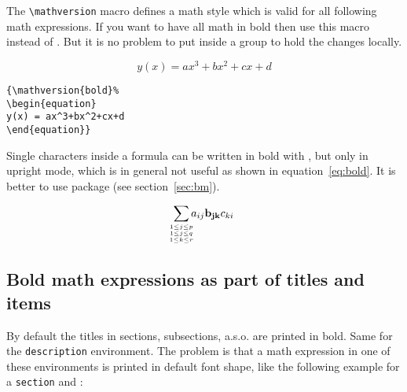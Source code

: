 \begin{table}[htb]
The \verb+\mathversion+ macro defines a math style which is valid for all following
math expressions. If you want to have all math in bold then use this macro instead of
. But it is no problem to put  inside a group to hold
the changes locally.

{%
\begin{equation}
y(x) = ax^3+bx^2+cx+d
\end{equation}}

\begin{lstlisting}
{\mathversion{bold}%
\begin{equation}
y(x) = ax^3+bx^2+cx+d
\end{equation}}
\end{lstlisting}


Single characters inside a formula can be written in bold with , 
but only in upright mode, which is in general not useful as shown in 
equation~\ref{eq:bold}. It is better
to use package  (see section~\vref{sec:bm}).

\begin{equation}\label{eq:bold}
\sum_{%
	\makebox[0pt]{$%
		{{\scriptscriptstyle 1\le j\le p\atop {%
		{1\le j\le q\atop 1\le k\le r}}}}%
	$}%
	}a_{ij}\mathbf{b_{jk}}c_{ki}
\end{equation}

\subsection[Bold math titles and items]{Bold math expressions as part of titles and items}\label{sec:titleItem}
By default the titles in sections, subsections, a.s.o. are printed in bold. Same for the
\verb|description| environment. The problem is that a math expression in one of these
environments is printed in default font shape, like the following example for a \verb|section| and
:

\medskip
{}


\end{table}
